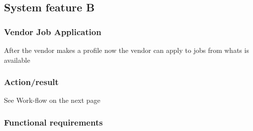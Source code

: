 \documentclass[10pt]{article}
\begin{document}




\subsection{System feature B}

\subsubsection{Vendor Job Application}

After the vendor makes a profile now the vendor can apply to jobs from whats is available

\subsubsection{Action/result}

See Work-flow on the next page



\subsubsection{ Functional requirements}

\lipsum[10]
\end{document}

